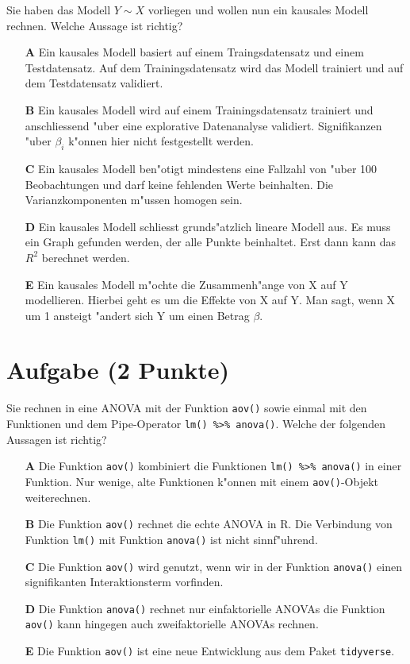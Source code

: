 \documentclass[a4paper, 10pt]{scrartcl}\usepackage[]{graphicx}\usepackage[]{xcolor}
\begin{document}
Sie haben das Modell $Y \sim X$ vorliegen und wollen nun ein
kausales Modell rechnen. Welche Aussage ist richtig?



\begin{enumerate}
\item [\textbf{A} \msquare] Ein kausales Modell basiert auf einem Traingsdatensatz und einem Testdatensatz. Auf dem Trainingsdatensatz wird das Modell trainiert und auf dem Testdatensatz validiert.
\item [\textbf{B} \msquare] Ein kausales Modell wird auf einem Trainingsdatensatz trainiert und anschliessend {"u}ber eine explorative Datenanalyse validiert. Signifikanzen {"u}ber $\beta_i$ k{"o}nnen hier nicht festgestellt werden.
\item [\textbf{C} \msquare] Ein kausales Modell ben{"o}tigt mindestens eine Fallzahl von {"u}ber 100 Beobachtungen und darf keine fehlenden Werte beinhalten. Die Varianzkomponenten m{"u}ssen homogen sein.
\item [\textbf{D} \msquare] Ein kausales Modell schliesst grunds{"a}tzlich lineare Modell aus. Es muss ein Graph gefunden werden, der alle Punkte beinhaltet. Erst dann kann das $R^2$ berechnet werden.
\item [\textbf{E} \msquare] Ein kausales Modell m{"o}chte die Zusammenh{"a}nge von X auf Y modellieren. Hierbei geht es um die Effekte von X auf Y. Man sagt, wenn X um 1 ansteigt {"a}ndert sich Y um einen Betrag $\beta$.
\end{enumerate}

\section{Aufgabe \hfill (2 Punkte)}

Sie rechnen in \Rlogo eine ANOVA mit der Funktion \texttt{aov()} sowie einmal
mit den Funktionen und dem Pipe-Operator \texttt{lm() \%>\%
  anova()}. Welche der folgenden Aussagen ist richtig?



\begin{enumerate}
\item [\textbf{A} \msquare] Die Funktion \texttt{aov()} kombiniert die Funktionen \texttt{lm() \%>\% anova()} in einer Funktion. Nur wenige, alte \Rlogo Funktionen k{"o}nnen mit einem \texttt{aov()}-Objekt weiterechnen.
\item [\textbf{B} \msquare] Die Funktion \texttt{aov()} rechnet die echte ANOVA in R. Die Verbindung von Funktion \texttt{lm()} mit Funktion \texttt{anova()} ist nicht sinnf{"u}hrend.
\item [\textbf{C} \msquare] Die Funktion \texttt{aov()} wird genutzt, wenn wir in der Funktion \texttt{anova()} einen signifikanten Interaktionsterm vorfinden.
\item [\textbf{D} \msquare] Die Funktion \texttt{anova()} rechnet nur einfaktorielle ANOVAs die Funktion \texttt{aov()} kann hingegen auch zweifaktorielle ANOVAs rechnen.
\item [\textbf{E} \msquare] Die Funktion \texttt{aov()} ist eine neue Entwicklung aus dem \Rlogo Paket \texttt{tidyverse}.
\end{enumerate}
\end{document}
